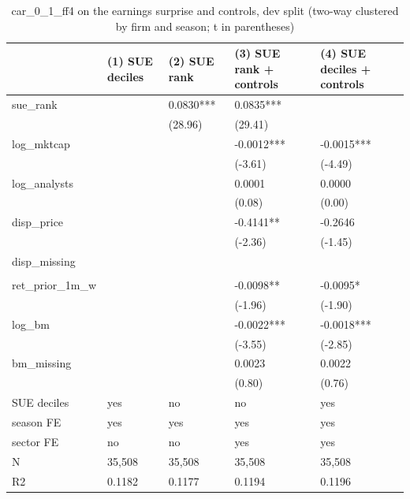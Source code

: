 \begin{table}
\caption{car_0_1_ff4 on the earnings surprise and controls, dev split (two-way clustered by firm and season; t in parentheses)}
\label{tab:cd_surprise_regressions__dev}
\begin{tabular}{lllll}
\toprule
 & (1) SUE deciles & (2) SUE rank & (3) SUE rank + controls & (4) SUE deciles + controls \\
\midrule
sue\_rank &  & 0.0830*** & 0.0835*** &  \\
 &  & (28.96) & (29.41) &  \\
log\_mktcap &  &  & -0.0012*** & -0.0015*** \\
 &  &  & (-3.61) & (-4.49) \\
log\_analysts &  &  & 0.0001 & 0.0000 \\
 &  &  & (0.08) & (0.00) \\
disp\_price &  &  & -0.4141** & -0.2646 \\
 &  &  & (-2.36) & (-1.45) \\
disp\_missing &  &  &  &  \\
 &  &  &  &  \\
ret\_prior\_1m\_w &  &  & -0.0098** & -0.0095* \\
 &  &  & (-1.96) & (-1.90) \\
log\_bm &  &  & -0.0022*** & -0.0018*** \\
 &  &  & (-3.55) & (-2.85) \\
bm\_missing &  &  & 0.0023 & 0.0022 \\
 &  &  & (0.80) & (0.76) \\
SUE deciles & yes & no & no & yes \\
season FE & yes & yes & yes & yes \\
sector FE & no & no & yes & yes \\
N & 35,508 & 35,508 & 35,508 & 35,508 \\
R2 & 0.1182 & 0.1177 & 0.1194 & 0.1196 \\
\bottomrule
\end{tabular}
\end{table}
